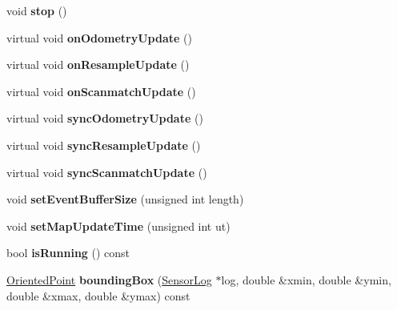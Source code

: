 \begin{DoxyCompactItemize}
void {\bfseries stop} ()
\item 
\mbox{\label{structGridSlamProcessorThread_a95af6181c93ec51f64e5c2fa86c86893}} 
virtual void {\bfseries on\+Odometry\+Update} ()
\item 
\mbox{\label{structGridSlamProcessorThread_a3a7298ce8e38b4753903c7c8f7fd94dc}} 
virtual void {\bfseries on\+Resample\+Update} ()
\item 
\mbox{\label{structGridSlamProcessorThread_ac816094bb1b69817356e56179d746726}} 
virtual void {\bfseries on\+Scanmatch\+Update} ()
\item 
\mbox{\label{structGridSlamProcessorThread_a019f44d49b69cc451edb80301ac80ffa}} 
virtual void {\bfseries sync\+Odometry\+Update} ()
\item 
\mbox{\label{structGridSlamProcessorThread_adfc0fbdd1a2f1d585e024692495519b4}} 
virtual void {\bfseries sync\+Resample\+Update} ()
\item 
\mbox{\label{structGridSlamProcessorThread_a8aa40ff654969ad1b2a2b38e10a52512}} 
virtual void {\bfseries sync\+Scanmatch\+Update} ()
\item 
\mbox{\label{structGridSlamProcessorThread_ab278d7c81576e97d53f5f0cb980b51ad}} 
void {\bfseries set\+Event\+Buffer\+Size} (unsigned int length)
\item 
\mbox{\label{structGridSlamProcessorThread_aa9b76fce8a1c351d1d3abc7db45936f1}} 
void {\bfseries set\+Map\+Update\+Time} (unsigned int ut)
\item 
\mbox{\label{structGridSlamProcessorThread_a5111ca7367f1a27ee7c9688528d7c9ac}} 
bool {\bfseries is\+Running} () const
\item 
\mbox{\label{structGridSlamProcessorThread_a8d4a9ee2c6f348b480e4efca4ff772df}} 
\hyperlink{structGMapping_1_1orientedpoint}{Oriented\+Point} {\bfseries bounding\+Box} (\hyperlink{classGMapping_1_1SensorLog}{Sensor\+Log} $\ast$log, double \&xmin, double \&ymin, double \&xmax, double \&ymax) const
\end{DoxyCompactItemize}

